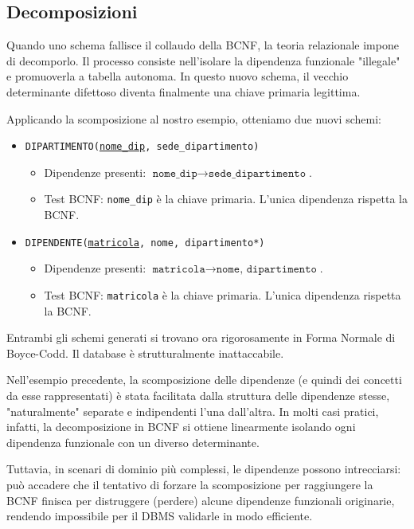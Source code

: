 \subsection{Decomposizioni}
Quando uno schema fallisce il collaudo della BCNF, la teoria relazionale impone di decomporlo. Il processo consiste nell'isolare la dipendenza funzionale "illegale" e promuoverla a tabella autonoma. In questo nuovo schema, il vecchio determinante difettoso diventa finalmente una chiave primaria legittima.

Applicando la scomposizione al nostro esempio, otteniamo due nuovi schemi:
\begin{itemize}
    \item \texttt{DIPARTIMENTO(\underline{nome\_dip}, sede\_dipartimento)}
    \begin{itemize}
        \item Dipendenze presenti: $\texttt{nome\_dip} \rightarrow \texttt{sede\_dipartimento}$.
        \item Test BCNF: \texttt{nome\_dip} è la chiave primaria. L'unica dipendenza rispetta la BCNF.
    \end{itemize}
    \item \texttt{DIPENDENTE(\underline{matricola}, nome, dipartimento*)}
    \begin{itemize}
        \item Dipendenze presenti: $\texttt{matricola} \rightarrow \texttt{nome, dipartimento}$.
        \item Test BCNF: \texttt{matricola} è la chiave primaria. L'unica dipendenza rispetta la BCNF.
    \end{itemize}
\end{itemize}

Entrambi gli schemi generati si trovano ora rigorosamente in Forma Normale di Boyce-Codd. Il database è strutturalmente inattaccabile.

\medskip

Nell'esempio precedente, la scomposizione delle dipendenze (e quindi dei concetti da esse rappresentati) è stata facilitata dalla struttura delle dipendenze stesse, "naturalmente" separate e indipendenti l'una dall'altra. In molti casi pratici, infatti, la decomposizione in BCNF si ottiene linearmente isolando ogni dipendenza funzionale con un diverso determinante.

Tuttavia, in scenari di dominio più complessi, le dipendenze possono intrecciarsi: può accadere che il tentativo di forzare la scomposizione per raggiungere la BCNF finisca per distruggere (perdere) alcune dipendenze funzionali originarie, rendendo impossibile per il DBMS validarle in modo efficiente. 

